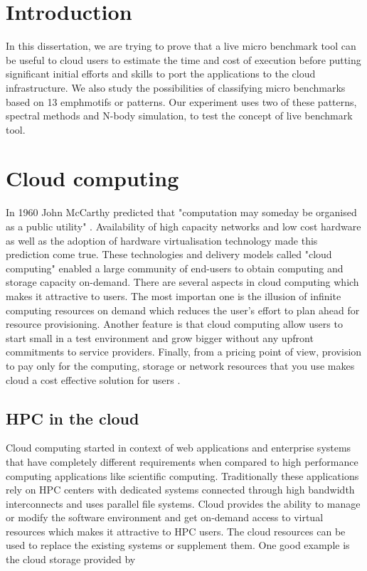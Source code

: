 \documentclass[12pt,a4paper]{report}
\begin{document}



\section{Introduction}  
In this dissertation, we are trying to prove that a live micro benchmark tool can be useful to cloud users to estimate 
the time and cost of execution before putting significant initial efforts and skills to port the applications to the cloud infrastructure. 
We also study the possibilities of classifying micro benchmarks based on 13 emph{motifs}\cite{} or patterns.  
Our experiment uses two of these patterns, spectral methods and N-body simulation, to test the concept of live benchmark tool.   

\section{Cloud computing}  
In 1960 John McCarthy predicted that "computation may someday be organised as a public utility" \cite {dikaiakos2009cloud}. 
Availability of high capacity networks and low cost hardware as well as the adoption of hardware virtualisation technology 
made this prediction come true. These technologies and delivery models called "cloud computing" enabled a large community of 
end-users to obtain computing and storage capacity on-demand.  
There are several aspects in cloud computing which makes it attractive to users. The most importan one is the illusion of 
infinite computing resources on demand which reduces the user's effort to plan ahead for resource provisioning. 
Another feature is that cloud computing allow users to start small in a test environment and grow bigger without any upfront 
commitments to service providers. Finally, from a pricing point of view, provision to pay only for the computing, storage or network 
resources that you use makes cloud a cost effective solution for users \cite {fox2009above}.  

\subsection{HPC in the cloud}  
Cloud computing started in context of web applications and enterprise systems that have completely different requirements 
when compared to high performance computing applications like scientific computing. Traditionally these applications rely 
on HPC centers with dedicated systems connected through high bandwidth interconnects and uses parallel file systems.   
Cloud provides the ability to manage or modify the software environment and get on-demand access to virtual resources 
which makes it attractive to HPC users. The cloud resources can be used to replace the existing systems or supplement them. 
One good example is the cloud storage provided by
    
\end{document}
